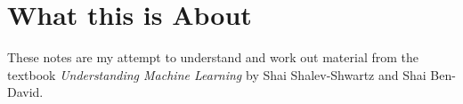 \chapter*{What this is About}


These notes are my attempt to understand and work out material from the
textbook \emph{Understanding Machine Learning} by Shai Shalev-Shwartz and
Shai Ben-David. 
